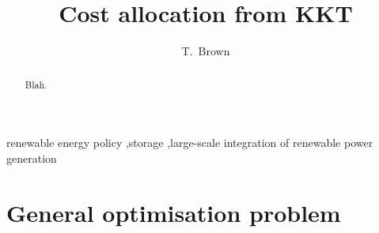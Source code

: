 \documentclass[final,3p,times]{elsarticle}
\begin{document}
\begin{frontmatter}





\title{Cost allocation from KKT}



\author[kit]{T.~Brown}



\address[kit]{Institute for Automation and Applied Informatics, Karlsruhe Institute of Technology, Hermann-von-Helmholtz-Platz 1, 76344 Eggenstein-Leopoldshafen, Germany}


\begin{abstract}
  Blah.
\end{abstract}


\begin{keyword}
 renewable energy policy \sep storage \sep large-scale integration of renewable power generation



\end{keyword}

\end{frontmatter}

\tableofcontents

\section{General optimisation problem}\label{sec:theory}
\end{document}
